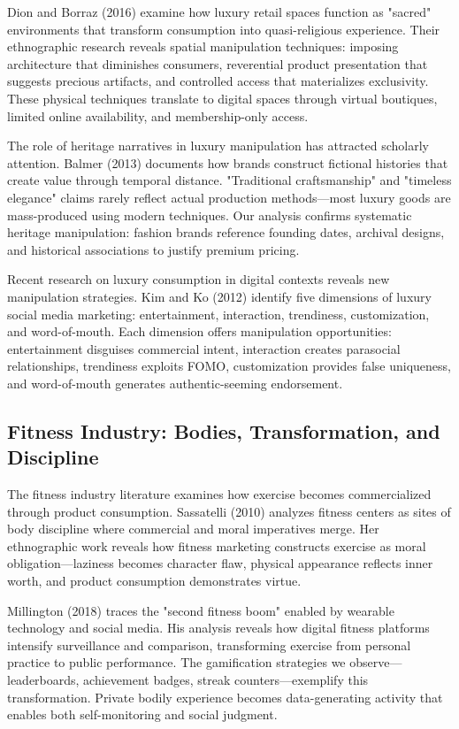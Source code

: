 Dion and Borraz (2016) examine how luxury retail spaces function as "sacred" environments that transform consumption into quasi-religious experience. Their ethnographic research reveals spatial manipulation techniques: imposing architecture that diminishes consumers, reverential product presentation that suggests precious artifacts, and controlled access that materializes exclusivity. These physical techniques translate to digital spaces through virtual boutiques, limited online availability, and membership-only access.

The role of heritage narratives in luxury manipulation has attracted scholarly attention. Balmer (2013) documents how brands construct fictional histories that create value through temporal distance. "Traditional craftsmanship" and "timeless elegance" claims rarely reflect actual production methods—most luxury goods are mass-produced using modern techniques. Our analysis confirms systematic heritage manipulation: fashion brands reference founding dates, archival designs, and historical associations to justify premium pricing.

Recent research on luxury consumption in digital contexts reveals new manipulation strategies. Kim and Ko (2012) identify five dimensions of luxury social media marketing: entertainment, interaction, trendiness, customization, and word-of-mouth. Each dimension offers manipulation opportunities: entertainment disguises commercial intent, interaction creates parasocial relationships, trendiness exploits FOMO, customization provides false uniqueness, and word-of-mouth generates authentic-seeming endorsement.

\subsection{Fitness Industry: Bodies, Transformation, and Discipline}

The fitness industry literature examines how exercise becomes commercialized through product consumption. Sassatelli (2010) analyzes fitness centers as sites of body discipline where commercial and moral imperatives merge. Her ethnographic work reveals how fitness marketing constructs exercise as moral obligation—laziness becomes character flaw, physical appearance reflects inner worth, and product consumption demonstrates virtue.

Millington (2018) traces the "second fitness boom" enabled by wearable technology and social media. His analysis reveals how digital fitness platforms intensify surveillance and comparison, transforming exercise from personal practice to public performance. The gamification strategies we observe—leaderboards, achievement badges, streak counters—exemplify this transformation. Private bodily experience becomes data-generating activity that enables both self-monitoring and social judgment.

